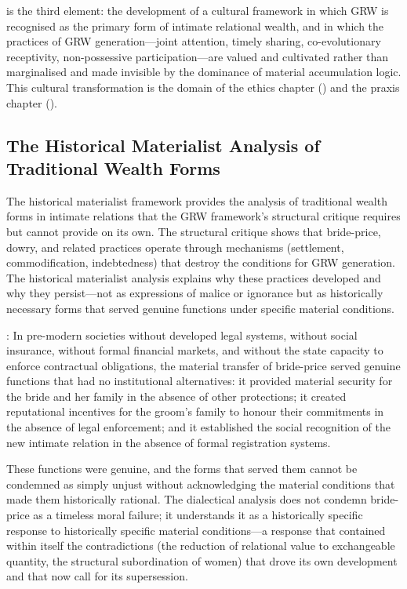  is the third element: the development of a cultural framework in which GRW is recognised as the primary form of intimate relational wealth, and in which the practices of GRW generation---joint attention, timely sharing, co-evolutionary receptivity, non-possessive participation---are valued and cultivated rather than marginalised and made invisible by the dominance of material accumulation logic. This cultural transformation is the domain of the ethics chapter () and the praxis chapter ().

\subsection{The Historical Materialist Analysis of Traditional Wealth Forms}
\label{p15:subsec:historical_materialist}

\noindent
The historical materialist framework provides the analysis of traditional wealth forms in intimate relations that the GRW framework's structural critique requires but cannot provide on its own. The structural critique shows that bride-price, dowry, and related practices operate through mechanisms (settlement, commodification, indebtedness) that destroy the conditions for GRW generation. The historical materialist analysis explains why these practices developed and why they persist---not as expressions of malice or ignorance but as historically necessary forms that served genuine functions under specific material conditions.

: In pre-modern societies without developed legal systems, without social insurance, without formal financial markets, and without the state capacity to enforce contractual obligations, the material transfer of bride-price served genuine functions that had no institutional alternatives: it provided material security for the bride and her family in the absence of other protections; it created reputational incentives for the groom's family to honour their commitments in the absence of legal enforcement; and it established the social recognition of the new intimate relation in the absence of formal registration systems.

These functions were genuine, and the forms that served them cannot be condemned as simply unjust without acknowledging the material conditions that made them historically rational. The dialectical analysis does not condemn bride-price as a timeless moral failure; it understands it as a historically specific response to historically specific material conditions---a response that contained within itself the contradictions (the reduction of relational value to exchangeable quantity, the structural subordination of women) that drove its own development and that now call for its supersession.

